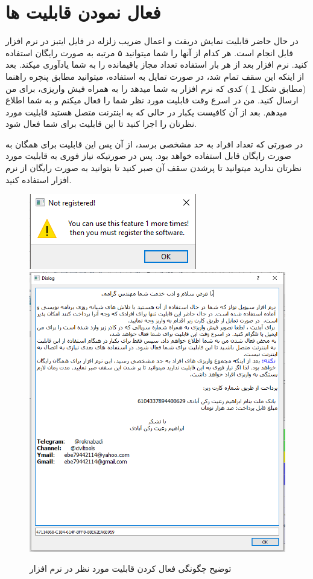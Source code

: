 \section{فعال نمودن قابلیت ها}
در حال حاضر قابلیت نمایش دریفت و اعمال ضریب زلزله در فایل ایتبز در نرم افزار قابل انجام است. هر کدام از آنها را شما میتوانید ۵ مرتبه به صورت رایگان استفاده کنید. نرم افزار بعد از هر بار استفاده تعداد مجاز باقیمانده را به شما یادآوری میکند. بعد از اینکه این سقف تمام شد،
در صورت تمایل به استفاده، میتوانید مطابق پنچره راهنما (مطابق شکل 
\ref{pic:register}
) کدی که نرم افزار به شما میدهد را به همراه فیش واریزی، برای من ارسال کنید. من در اسرع وقت  قابلیت مورد نظر شما را فعال میکنم و به شما اطلاع میدهم. بعد از آن کافیست یکبار در حالی که به اینترنت متصل هستید قابلیت مورد نظرتان را اجرا کنید تا این قابلیت برای شما فعال شود.

در صورتی که تعداد افراد به حد مشخصی برسد، از آن پس این قابلیت برای همگان به صورت رایگان قابل استفاده خواهد بود. پس در صورتیکه نیاز فوری به قابلیت مورد نظرتان ندارید میتوانید تا پرشدن سقف آن صبر کنید تا بتوانید به صورت رایگان از نرم افزار استفاده کنید.

 
 \begin{figure}
     \centering
     \includegraphics[scale=0.7]{figures/no_of_using}
     \includegraphics[scale=0.7]{figures/register}
     \caption{توضیح چگونگی فعال کردن قابلیت مورد نظر در نرم افزار}
     \label{pic:register}
 \end{figure}
 
